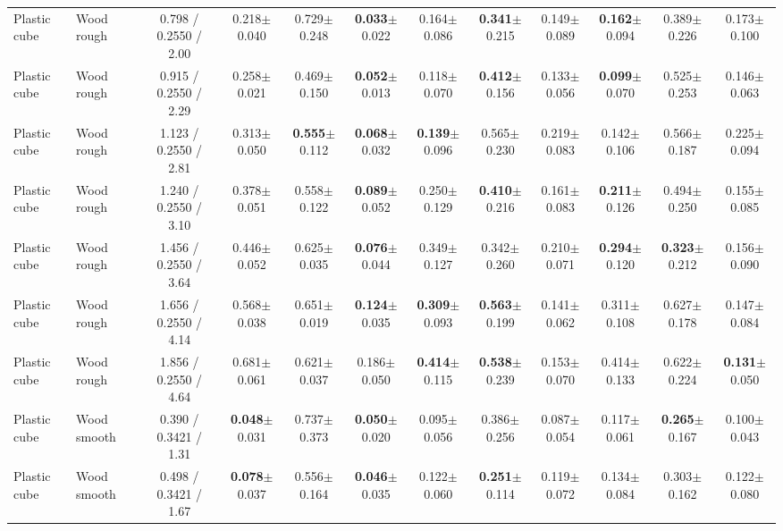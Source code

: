 \begin{table}[t]
{\begin{tabular}{l l c c c c c c c c c c }
        Plastic cube & Wood rough & 0.798 / 0.2550 / 2.00 & 0.218$\pm$0.040 & 0.729$\pm$0.248 & \textbf{0.033}$\pm$0.022 & 0.164$\pm$0.086 & \textbf{0.341}$\pm$0.215 & 0.149$\pm$0.089 & \textbf{0.162}$\pm$0.094 & 0.389$\pm$0.226 & 0.173$\pm$0.100 \\
        Plastic cube & Wood rough & 0.915 / 0.2550 / 2.29 & 0.258$\pm$0.021 & 0.469$\pm$0.150 & \textbf{0.052}$\pm$0.013 & 0.118$\pm$0.070 & \textbf{0.412}$\pm$0.156 & 0.133$\pm$0.056 & \textbf{0.099}$\pm$0.070 & 0.525$\pm$0.253 & 0.146$\pm$0.063 \\
        Plastic cube & Wood rough & 1.123 / 0.2550 / 2.81 & 0.313$\pm$0.050 & \textbf{0.555}$\pm$0.112 & \textbf{0.068}$\pm$0.032 & \textbf{0.139}$\pm$0.096 & 0.565$\pm$0.230 & 0.219$\pm$0.083 & 0.142$\pm$0.106 & 0.566$\pm$0.187 & 0.225$\pm$0.094 \\
        Plastic cube & Wood rough & 1.240 / 0.2550 / 3.10 & 0.378$\pm$0.051 & 0.558$\pm$0.122 & \textbf{0.089}$\pm$0.052 & 0.250$\pm$0.129 & \textbf{0.410}$\pm$0.216 & 0.161$\pm$0.083 & \textbf{0.211}$\pm$0.126 & 0.494$\pm$0.250 & 0.155$\pm$0.085 \\
        Plastic cube & Wood rough & 1.456 / 0.2550 / 3.64 & 0.446$\pm$0.052 & 0.625$\pm$0.035 & \textbf{0.076}$\pm$0.044 & 0.349$\pm$0.127 & 0.342$\pm$0.260 & 0.210$\pm$0.071 & \textbf{0.294}$\pm$0.120 & \textbf{0.323}$\pm$0.212 & 0.156$\pm$0.090 \\
        Plastic cube & Wood rough & 1.656 / 0.2550 / 4.14 & 0.568$\pm$0.038 & 0.651$\pm$0.019 & \textbf{0.124}$\pm$0.035 & \textbf{0.309}$\pm$0.093 & \textbf{0.563}$\pm$0.199 & 0.141$\pm$0.062 & 0.311$\pm$0.108 & 0.627$\pm$0.178 & 0.147$\pm$0.084 \\
        Plastic cube & Wood rough & 1.856 / 0.2550 / 4.64 & 0.681$\pm$0.061 & 0.621$\pm$0.037 & 0.186$\pm$0.050 & \textbf{0.414}$\pm$0.115 & \textbf{0.538}$\pm$0.239 & 0.153$\pm$0.070 & 0.414$\pm$0.133 & 0.622$\pm$0.224 & \textbf{0.131}$\pm$0.050 \\
        Plastic cube & Wood smooth & 0.390 / 0.3421 / 1.31 & \textbf{0.048}$\pm$0.031 & 0.737$\pm$0.373 & \textbf{0.050}$\pm$0.020 & 0.095$\pm$0.056 & 0.386$\pm$0.256 & 0.087$\pm$0.054 & 0.117$\pm$0.061 & \textbf{0.265}$\pm$0.167 & 0.100$\pm$0.043 \\
        Plastic cube & Wood smooth & 0.498 / 0.3421 / 1.67 & \textbf{0.078}$\pm$0.037 & 0.556$\pm$0.164 & \textbf{0.046}$\pm$0.035 & 0.122$\pm$0.060 & \textbf{0.251}$\pm$0.114 & 0.119$\pm$0.072 & 0.134$\pm$0.084 & 0.303$\pm$0.162 & 0.122$\pm$0.080 \\

\end{tabular}}
\end{table}
